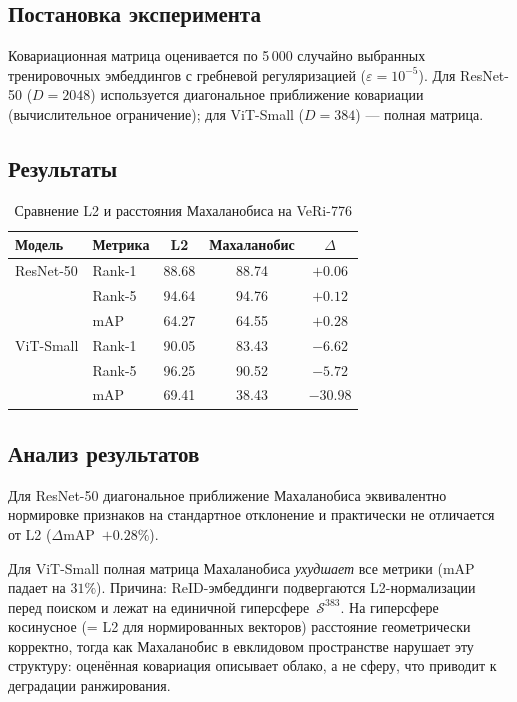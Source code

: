 \subsection{Постановка эксперимента}

Ковариационная матрица оценивается по 5\,000 случайно выбранных тренировочных
эмбеддингов с гребневой регуляризацией ($\varepsilon = 10^{-5}$).
Для ResNet-50 ($D=2048$) используется диагональное приближение ковариации
(вычислительное ограничение); для ViT-Small ($D=384$) --- полная матрица.

\subsection{Результаты}

\begin{table}[H]
\centering
\caption{Сравнение L2 и расстояния Махаланобиса на VeRi-776}
\label{tab:mahalanobis}
\begin{tabular}{l|l|c|c|c}
\hline
\textbf{Модель} & \textbf{Метрика} & \textbf{L2} & \textbf{Махаланобис} & \textbf{$\Delta$} \\
\hline
ResNet-50 & Rank-1 & 88.68 & 88.74 & $+0.06$ \\
          & Rank-5 & 94.64 & 94.76 & $+0.12$ \\
          & mAP    & 64.27 & 64.55 & $+0.28$ \\
\hline
ViT-Small & Rank-1 & 90.05 & 83.43 & $-6.62$ \\
          & Rank-5 & 96.25 & 90.52 & $-5.72$ \\
          & mAP    & 69.41 & 38.43 & $-30.98$ \\
\hline
\end{tabular}
\end{table}

\subsection{Анализ результатов}

Для ResNet-50 диагональное приближение Махаланобиса эквивалентно нормировке
признаков на стандартное отклонение и практически не отличается от L2 ($\Delta$mAP~$+0.28\%$).

Для ViT-Small полная матрица Махаланобиса \emph{ухудшает} все метрики
(mAP падает на $31\%$). Причина: ReID-эмбеддинги подвергаются L2-нормализации
перед поиском и лежат на единичной гиперсфере~$\mathcal{S}^{383}$.
На гиперсфере косинусное (= L2 для нормированных векторов) расстояние геометрически
корректно, тогда как Махаланобис в евклидовом пространстве нарушает эту структуру:
оценённая ковариация описывает облако, а не сферу, что приводит к деградации ранжирования.

